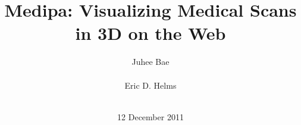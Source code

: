 \documentclass{acm_proc_article-sp}
\begin{document}
\title{Medipa: Visualizing Medical Scans in 3D on the Web}
%
%
%
%
%

%
\author{
%
%
\alignauthor
Juhee Bae\\
       \\
\alignauthor
Eric D. Helms\\
       \\
}
\date{12 December 2011}
\end{document}
